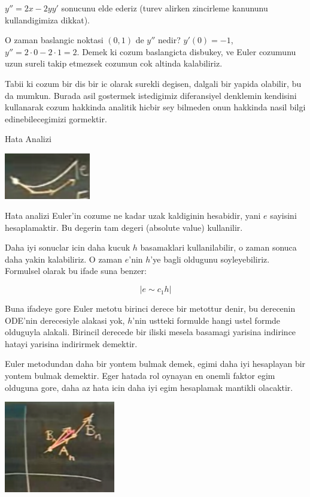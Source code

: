 \documentclass[12pt,fleqn]{article}\usepackage{../common}
\begin{document}
$y'' = 2x - 2yy'$ sonucunu elde ederiz (turev alirken zincirleme kanununu
kullandigimiza dikkat).

O zaman baslangic noktasi $(0,1)$ de $y''$ nedir? $y'(0) = -1$, $y''= 2 \cdot 0
- 2\cdot 1 = 2$. 
Demek ki cozum baslangicta disbukey, ve Euler cozumunu uzun sureli takip
etmezsek cozumun cok altinda kalabiliriz. 

Tabii ki cozum bir dis bir ic olarak surekli degisen, dalgali bir yapida
olabilir, bu da mumkun. Burada asil gostermek istedigimiz diferansiyel denklemin
kendisini kullanarak cozum hakkinda analitik hicbir sey bilmeden onun hakkinda
nasil bilgi edinebilecegimizi gormektir. 

Hata Analizi

\includegraphics[height=2cm]{2_3.png}

Hata analizi Euler'in cozume ne kadar uzak kaldiginin hesabidir, yani $e$
sayisini hesaplamaktir. Bu degerin tam degeri (absolute value) kullanilir. 

Daha iyi sonuclar icin daha kucuk $h$ basamaklari kullanilabilir, o zaman sonuca
daha yakin kalabiliriz. O zaman $e$'nin $h$'ye bagli oldugunu
soyleyebiliriz. Formulsel olarak bu ifade suna benzer:

\[ |e \sim c_1 h| \]

Buna ifadeye gore Euler metotu birinci derece bir metottur denir, bu derecenin
ODE'nin derecesiyle alakasi yok, $h$'nin ustteki formulde hangi ustel formde
olduguyla alakali. Birincil derecede bir iliski mesela basamagi yarisina
indirince hatayi yarisina indirirmek demektir.

Euler metodundan daha bir yontem bulmak demek, egimi daha iyi hesaplayan bir
yontem bulmak demektir. Eger hatada rol oynayan en onemli faktor egim olduguna
gore, daha az hata icin daha iyi egim hesaplamak mantikli olacaktir. 

\includegraphics[height=4cm]{2_4.png}
\end{document}

